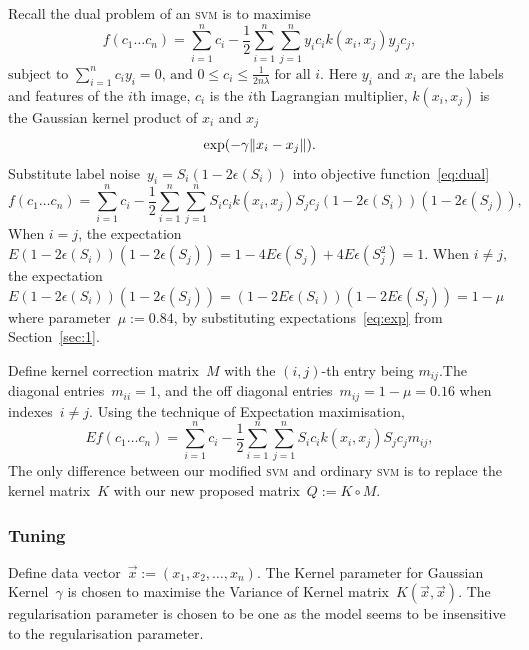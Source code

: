 \documentclass{article} %
\DeclarePairedDelimiter{\norm}{\lVert}{\rVert}
\begin{document}
Recall the dual problem of an \textsc{svm} is to maximise
\begin{equation}
   f(c_{1}\ldots c_{n})=\sum _{i=1}^{n}c_{i}-{\frac {1}{2}}\sum _{i=1}^{n}\sum _{j=1}^{n}y_{i}c_{i}k(x_{i},x_{j})y_{j}c_{j}, \label{eq:dual}
\end{equation}
\begin{math}
{\text{subject to }}\sum _{i=1}^{n}c_{i}y_{i}=0,\,{\text{and }}0\leq c_{i}\leq {\frac {1}{2n\lambda }}\;{\text{for all }}i. 
\end{math} 
Here $y_i$ and $x_i$ are the labels and features of the $i$th image, $c_i$ is the $i$th Lagrangian multiplier, $k(x_i,x_j)$ is the Gaussian kernel product of $x_i$ and $x_j$
\begin{equation*}
\exp(-\gamma\norm{x_i-x_j}).
\end{equation*}
Substitute label noise~$y_i=S_i(1-2\epsilon(S_i))$ into objective function~\eqref{eq:dual}
\begin{equation}
   f(c_{1}\ldots c_{n})=\sum _{i=1}^{n}c_{i}-{\frac {1}{2}}\sum _{i=1}^{n}\sum _{j=1}^{n}S_{i}c_{i}k(x_{i},x_{j})S_{j}c_{j}(1-2\epsilon(S_i))(1-2\epsilon(S_j)), \label{eq:dual2}
\end{equation}
When $i=j$, the expectation~$E(1-2\epsilon(S_i))(1-2\epsilon(S_j))=1-4E\epsilon(S_j)+4E\epsilon(S_j^2)=1$. When $i\neq j$, the expectation~$E(1-2\epsilon(S_i))(1-2\epsilon(S_j))=(1-2E\epsilon(S_i))(1-2E\epsilon(S_j))=1-\mu$ where parameter~$\mu:=0.84$, by substituting expectations~\eqref{eq:exp} from Section~\ref{sec:1}. 

Define kernel correction matrix~$M$ with the $(i,j)$-th entry being $m_{ij}$.The diagonal entries~$m_{ii}=1 $, and the off diagonal entries~$m_{ij}=1-\mu=0.16$ when indexes~$i\neq j$. Using the technique of Expectation maximisation, 
\begin{equation}
   Ef(c_{1}\ldots c_{n})=\sum _{i=1}^{n}c_{i}-{\frac {1}{2}}\sum _{i=1}^{n}\sum _{j=1}^{n}S_{i}c_{i}k(x_{i},x_{j})S_{j}c_{j}m_{ij}, \label{eq:dual3}
\end{equation}
The only difference between our modified \textsc{svm} and ordinary \textsc{svm} is to replace the kernel matrix~$K$ with our new proposed matrix~$Q:=K\circ M$.

\subsubsection{Tuning}
Define data vector~$\vec{x}:=(x_1,x_2,\ldots , x_n)$. The Kernel parameter for Gaussian Kernel~$\gamma$ is chosen to maximise the Variance of Kernel matrix~$K(\vec{x},\vec{x})$. The regularisation parameter is chosen to be one as the model seems to be insensitive to the regularisation parameter.
\end{document}
